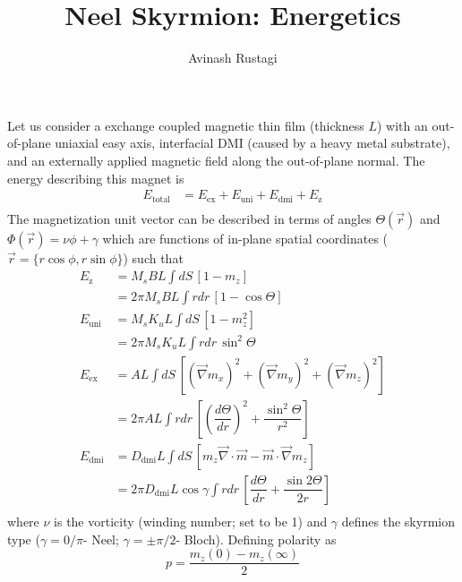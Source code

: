 \documentclass[aps,prb,onecolumn,notitlepage,showpacs,floatfix,superscriptaddress]{revtex4-1}
\newcommand{\mrm}[1]{\mathrm{#1}}
\begin{document}
\title{Neel Skyrmion: Energetics}

\author{Avinash Rustagi}
%

\maketitle
%
Let us consider a exchange coupled magnetic thin film (thickness $L$) with an out-of-plane uniaxial easy axis, interfacial DMI (caused by a heavy metal substrate), and an externally applied magnetic field along the out-of-plane normal. The energy describing this magnet is
\begin{equation}
\begin{split}
E_\mrm{total} &= E_\mrm{ex} + E_\mrm{uni} + E_\mrm{dmi} + E_\mrm{z}\\
\end{split}
\end{equation}
The magnetization unit vector can be described in terms of angles $\Theta (\vec{r})$ and $\Phi(\vec{r})=\nu \phi + \gamma$ which are functions of in-plane spatial coordinates ($\vec{r}=\{r\cos\phi, r\sin\phi\}$) such that
\begin{equation}
\begin{split}
E_\mrm{z} &= M_s B L \int dS\, [1-m_z] \\
&= 2\pi M_s B L \int rdr\, [1-\cos\Theta]\\
E_\mrm{uni} &= M_s K_u L \int dS\, [1-m_z^2] \\
&= 2\pi M_s K_u L \int rdr\, \sin^2\Theta\\ 
E_\mrm{ex} &= A L \int dS\, [(\vec{\nabla} m_x)^2+(\vec{\nabla} m_y)^2+(\vec{\nabla} m_z)^2] \\
&= 2\pi A L \int rdr\, \left[ \left(\dfrac{d\Theta}{dr}\right)^2 + \dfrac{\sin^2\Theta}{r^2}\right]\\ 
E_\mrm{dmi} &= D_\mrm{dmi} L \int dS\, [m_z \vec{\nabla} \cdot \vec{m}- \vec{m}\cdot \vec{\nabla} m_z] \\
&= 2\pi D_\mrm{dmi} L \cos\gamma \int rdr\, \left[ \dfrac{d\Theta}{dr} + \dfrac{\sin2\Theta}{2r}\right]\\ 
\end{split}
\end{equation}
where $\nu$ is the vorticity (winding number; set to be 1) and $\gamma$ defines the skyrmion type ($\gamma=0/\pi$- Neel; $\gamma=\pm\pi/2$- Bloch). Defining polarity as
\begin{equation}
p = \dfrac{m_z(0)-m_{z}(\infty)}{2}
\end{equation}
\end{document}
